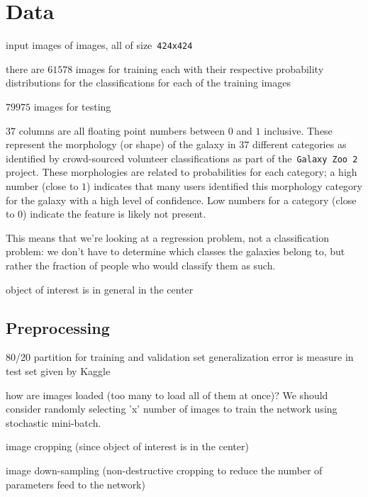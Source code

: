\section{Data}

input images of images, all of size~\texttt{424x424}

there are $61578$ images for training each with their respective probability distributions for the classifications for each of the training images

$79975$ images for testing

$37$ columns are all floating point numbers between $0$ and $1$ inclusive. These represent the morphology (or shape) of the galaxy in $37$ different categories as identified by crowd-sourced volunteer classifications as part of the~\texttt{Galaxy Zoo 2} project. These morphologies are related to probabilities for each category; a high number (close to $1$) indicates that many users identified this morphology category for the galaxy with a high level of confidence. Low numbers for a category (close to $0$) indicate the feature is likely not present.

This means that we’re looking at a regression problem, not a classification problem: we don’t have to determine which classes the galaxies belong to, but rather the fraction of people who would classify them as such.

object of interest is in general in the center


\subsection{Preprocessing}

80/20 partition for training and validation set
generalization error is measure in test set given by Kaggle

how are images loaded (too many to load all of them at once)? We should consider randomly selecting 'x' number of images to train the network using stochastic mini-batch.

image cropping (since object of interest is in the center)

image down-sampling (non-destructive cropping to reduce the number of parameters feed to the network)

